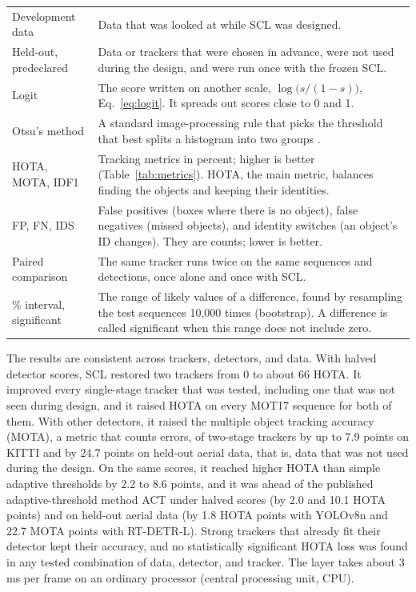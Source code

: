 \documentclass[pdflatex,sn-mathphys-num,iicol]{sn-jnl}
\newcommand{\scl}{SCL}
\begin{document}
\begin{table}[t]
\begin{tabular}{@{}>{\raggedright\arraybackslash}p{32mm}>{\raggedright\arraybackslash}p{123mm}@{}}
Development data & Data that was looked at while \scl{} was designed.\\
Held-out, predeclared & Data or trackers that were chosen in advance, were not used during the design, and were run once with the frozen \scl{}.\\
Logit & The score written on another scale, $\log\bigl(s/(1-s)\bigr)$, Eq.~\eqref{eq:logit}. It spreads out scores close to 0 and 1.\\
Otsu's method & A standard image-processing rule that picks the threshold that best splits a histogram into two groups \cite{otsu1979}.\\
HOTA, MOTA, IDF1 & Tracking metrics in percent; higher is better (Table~\ref{tab:metrics}). HOTA, the main metric, balances finding the objects and keeping their identities.\\
FP, FN, IDS & False positives (boxes where there is no object), false negatives (missed objects), and identity switches (an object's ID changes). They are counts; lower is better.\\
Paired comparison & The same tracker runs twice on the same sequences and detections, once alone and once with \scl{}.\\
95\% interval, significant & The range of likely values of a difference, found by resampling the test sequences 10,000 times (bootstrap). A difference is called significant when this range does not include zero.\\
\bottomrule
\end{tabular}
\end{table}

The results are consistent across trackers, detectors, and data. With halved
detector scores, \scl{} restored two trackers from 0 to about 66 HOTA. It
improved every single-stage tracker that was tested, including one that was
not seen during design, and it raised HOTA on every MOT17 sequence for both of
them. With other detectors, it raised the multiple object tracking accuracy
(MOTA), a metric that counts errors, of two-stage trackers by up to 7.9 points
on KITTI and by 24.7 points on held-out aerial data, that is, data that was
not used during the design. On the same scores, it reached higher HOTA than
simple adaptive thresholds by 2.2 to 8.6 points, and it was ahead of the
published adaptive-threshold method ACT under halved scores (by 2.0 and 10.1
HOTA points) and on held-out aerial data (by 1.8 HOTA points with YOLOv8n and
22.7 MOTA points with RT-DETR-L). Strong trackers that already fit their
detector kept their accuracy, and no statistically significant HOTA loss was
found in any tested combination of data, detector, and tracker. The layer
takes about 3 ms per frame on an ordinary processor (central processing unit,
CPU).
\end{document}
